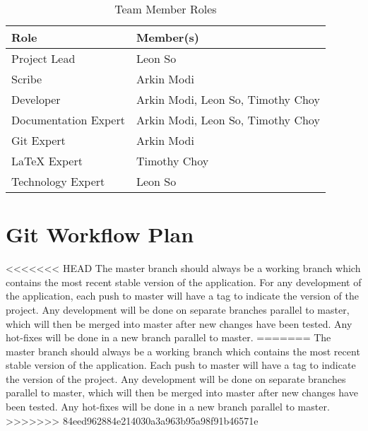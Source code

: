 \documentclass{article}
\begin{document}
\begin{table}[H]
    \centering
    \caption{Team Member Roles}
    \vspace{5pt}
    \begin{tabular}{|l|l|}
        \hline
        \textbf{Role} & \textbf{Member(s)} \\
        \hline
        Project Lead & Leon So\\
        \hline
        Scribe & Arkin Modi\\
        \hline
        Developer & Arkin Modi, Leon So, Timothy Choy \\
        \hline
        Documentation Expert & Arkin Modi, Leon So, Timothy Choy \\
        \hline
        Git Expert & Arkin Modi \\
        \hline
        LaTeX Expert & Timothy Choy \\
        \hline
        Technology Expert & Leon So \\
        \hline
    \end{tabular}
\end{table}


\section{Git Workflow Plan}
<<<<<<< HEAD
The master branch should always be a working branch which contains the most recent stable version of the application. For any development of the application, each push to master will have a tag to indicate the version of the project. Any development will be done on separate branches parallel to master, which will then be merged into master after new changes have been tested. Any hot-fixes will be done in a new branch parallel to master.
=======
The master branch should always be a working branch which contains the most recent stable version of the application. Each push to master will have a tag to indicate the version of the project. Any development will be done on separate branches parallel to master, which will then be merged into master after new changes have been tested. Any hot-fixes will be done in a new branch parallel to master.
>>>>>>> 84eed962884e214030a3a963b95a98f91b46571e
\end{document}
